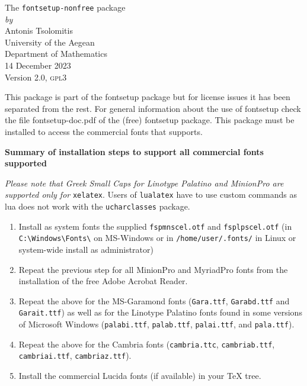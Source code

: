 \documentclass{book}
\begin{document}
  \begin{center}
    {\LARGE The \texttt{fontsetup-nonfree} package}\\[1ex]
    \textit{by}\\[1ex]
    {\large Antonis Tsolomitis}\\
University of the Aegean\\ Department of Mathematics\\[1ex]
	  \textsc{14} December \textsc{2023}\\[1ex]
	  Version 2.0, \textsc{gpl3}
  \end{center}

  This package is part of the fontsetup package but for license issues it has been
  separated from the rest. For general information about the use of fontsetup check
  the file fontsetup-doc.pdf of the (free) fontsetup package. This package must
  be installed to access the commercial fonts that supports.

\bigskip

\textbf{Summary of installation steps to support all commercial fonts supported}

\medskip

\textit{Please note that Greek Small Caps for Linotype Palatino and MinionPro
  are supported only for} \verb|xelatex|.
 Users of \verb|lualatex| have to use custom commands as lua does not work with
  the \verb|ucharclasses| package.
\medskip

\begin{enumerate}
\item Install as system fonts the supplied \verb|fspmnscel.otf|
  and \verb|fsplpscel.otf| (in \verb|C:\Windows\Fonts\| on MS-Windows or in
  \verb|/home/user/.fonts/| in Linux or system-wide install as administrator)
\item Repeat the previous step for all MinionPro and MyriadPro fonts from the
  installation of the free Adobe Acrobat Reader.
\item Repeat the above for the MS-Garamond fonts (\verb|Gara.ttf|, \verb|Garabd.ttf|
  and \verb|Garait.ttf|) as well as for the Linotype Palatino fonts
  found in some versions of Microsoft Windows (\verb|palabi.ttf|, \verb|palab.ttf|,
  \verb|palai.ttf|, and \verb|pala.ttf|).
\item Repeat the above for the Cambria fonts (\verb|cambria.ttc|, \verb|cambriab.ttf|,
  \verb|cambriai.ttf|, \verb|cambriaz.ttf|).
\item Install the commercial Lucida fonts (if available) in your TeX tree.
\end{enumerate}
\end{document}
